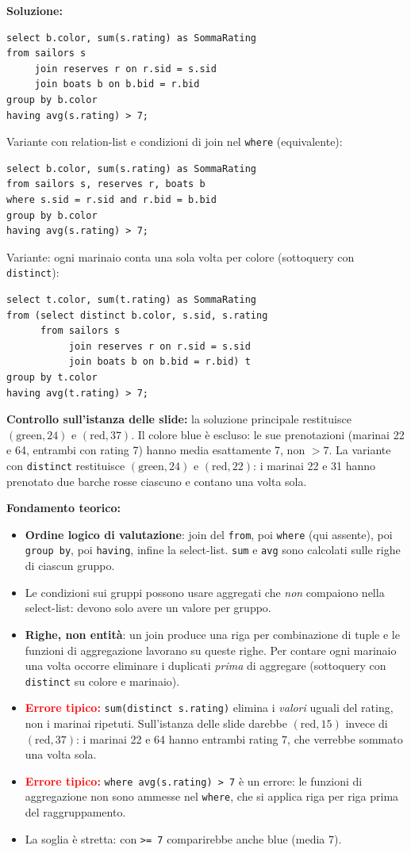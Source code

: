 \documentclass[12pt, a4paper]{article}
\begin{document}
\textbf{Soluzione:}
\begin{verbatim}
select b.color, sum(s.rating) as SommaRating
from sailors s
     join reserves r on r.sid = s.sid
     join boats b on b.bid = r.bid
group by b.color
having avg(s.rating) > 7;
\end{verbatim}
Variante con relation-list e condizioni di join nel \texttt{where} (equivalente):
\begin{verbatim}
select b.color, sum(s.rating) as SommaRating
from sailors s, reserves r, boats b
where s.sid = r.sid and r.bid = b.bid
group by b.color
having avg(s.rating) > 7;
\end{verbatim}
Variante: ogni marinaio conta una sola volta per colore (sottoquery con \texttt{distinct}):
\begin{verbatim}
select t.color, sum(t.rating) as SommaRating
from (select distinct b.color, s.sid, s.rating
      from sailors s
           join reserves r on r.sid = s.sid
           join boats b on b.bid = r.bid) t
group by t.color
having avg(t.rating) > 7;
\end{verbatim}
\textbf{Controllo sull'istanza delle slide:} la soluzione principale restituisce $(\text{green},24)$ e $(\text{red},37)$. Il colore blue è escluso: le sue prenotazioni (marinai 22 e 64, entrambi con rating 7) hanno media esattamente 7, non $>7$. La variante con \texttt{distinct} restituisce $(\text{green},24)$ e $(\text{red},22)$: i marinai 22 e 31 hanno prenotato due barche rosse ciascuno e contano una volta sola.

\textbf{Fondamento teorico:}
\begin{itemize}
\item \textbf{Ordine logico di valutazione}: join del \texttt{from}, poi \texttt{where} (qui assente), poi \texttt{group by}, poi \texttt{having}, infine la select-list. \texttt{sum} e \texttt{avg} sono calcolati sulle righe di ciascun gruppo.
\item Le condizioni sui gruppi possono usare aggregati che \emph{non} compaiono nella select-list: devono solo avere un valore per gruppo.
\item \textbf{Righe, non entità}: un join produce una riga per combinazione di tuple e le funzioni di aggregazione lavorano su queste righe. Per contare ogni marinaio una volta occorre eliminare i duplicati \emph{prima} di aggregare (sottoquery con \texttt{distinct} su colore e marinaio).
\item \textcolor{red}{\textbf{Errore tipico:}} \texttt{sum(distinct s.rating)} elimina i \emph{valori} uguali del rating, non i marinai ripetuti. Sull'istanza delle slide darebbe $(\text{red},15)$ invece di $(\text{red},37)$: i marinai 22 e 64 hanno entrambi rating 7, che verrebbe sommato una volta sola.
\item \textcolor{red}{\textbf{Errore tipico:}} \texttt{where avg(s.rating) > 7} è un errore: le funzioni di aggregazione non sono ammesse nel \texttt{where}, che si applica riga per riga prima del raggruppamento.
\item La soglia è stretta: con \texttt{>= 7} comparirebbe anche blue (media 7).
\end{itemize}
\end{document}
